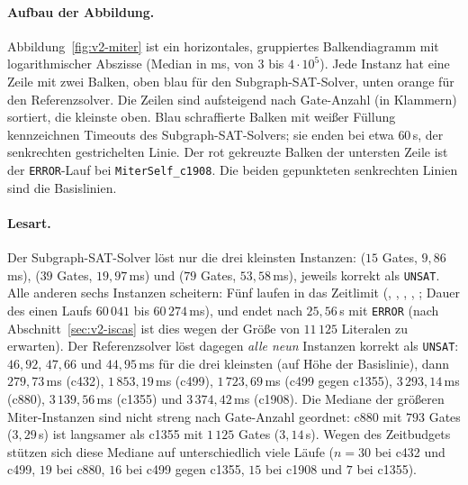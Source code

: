 \documentclass[a4paper,12pt]{article}
\theoremstyle{definition}
\begin{document}
\paragraph{Aufbau der Abbildung.} Abbildung~\ref{fig:v2-miter} ist ein horizontales, gruppiertes Balkendiagramm mit logarithmischer Abszisse (Median in ms, von $3$ bis $4 \cdot 10^5$). Jede Instanz hat eine Zeile mit zwei Balken, oben blau für den Subgraph-SAT-Solver, unten orange für den Referenzsolver. Die Zeilen sind aufsteigend nach Gate-Anzahl (in Klammern) sortiert, die kleinste oben. Blau schraffierte Balken mit weißer Füllung kennzeichnen Timeouts des Subgraph-SAT-Solvers; sie enden bei etwa $60$\,s, der senkrechten gestrichelten Linie. Der rot gekreuzte Balken der untersten Zeile ist der \texttt{ERROR}-Lauf bei \texttt{MiterSelf\_c1908}. Die beiden gepunkteten senkrechten Linien sind die Basislinien.

\paragraph{Lesart.} Der Subgraph-SAT-Solver löst nur die drei kleinsten Instanzen:  ($15$ Gates, $9{,}86$\,ms),  ($39$ Gates, $19{,}97$\,ms) und  ($79$ Gates, $53{,}58$\,ms), jeweils korrekt als \texttt{UNSAT}. Alle anderen sechs Instanzen scheitern: Fünf laufen in das Zeitlimit (, , , , ; Dauer des einen Laufs $60\,041$ bis $60\,274$\,ms), und  endet nach $25{,}56$\,s mit \texttt{ERROR} (nach Abschnitt~\ref{sec:v2-iscas} ist dies wegen der Größe von $11\,125$ Literalen zu erwarten). Der Referenzsolver löst dagegen \emph{alle neun} Instanzen korrekt als \texttt{UNSAT}: $46{,}92$, $47{,}66$ und $44{,}95$\,ms für die drei kleinsten (auf Höhe der Basislinie), dann $279{,}73$\,ms (c432), $1\,853{,}19$\,ms (c499), $1\,723{,}69$\,ms (c499 gegen c1355), $3\,293{,}14$\,ms (c880), $3\,139{,}56$\,ms (c1355) und $3\,374{,}42$\,ms (c1908). Die Mediane der größeren Miter-Instanzen sind nicht streng nach Gate-Anzahl geordnet: c880 mit $793$ Gates ($3{,}29$\,s) ist langsamer als c1355 mit $1\,125$ Gates ($3{,}14$\,s). Wegen des Zeitbudgets stützen sich diese Mediane auf unterschiedlich viele Läufe ($n=30$ bei c432 und c499, $19$ bei c880, $16$ bei c499 gegen c1355, $15$ bei c1908 und $7$ bei c1355).
\end{document}
